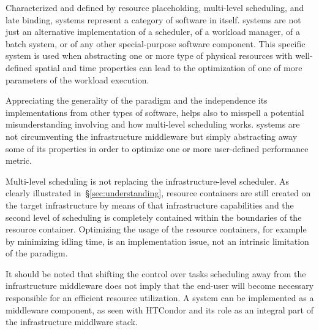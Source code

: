 \documentclass{sig-alternate}
\begin{document}
Characterized and defined by resource placeholding, multi-level scheduling, and
late binding, \pilot systems represent a category of software in itself. \pilot
systems are not just an alternative implementation of a scheduler, of a
workload manager, of a batch system, or of any other special-purpose software
component. This specific system is used when abstracting one or more type of
physical resources with well-defined spatial and time properties can lead to
the optimization of one of more parameters of the workload execution.

Appreciating the generality of the \pilot paradigm and the independence its
implementations from other types of software, helps also to misspell a
potential misunderstanding involving \pilots and how multi-level scheduling
works. \pilot systems are not circumventing the infrastructure middleware but
simply abstracting away some of its properties in order to optimize one or more
user-defined performance metric.

Multi-level scheduling is not replacing the infrastructure-level scheduler. As
clearly illustrated in~\S\ref{sec:understanding}, resource containers are still
created on the target infrastructure by means of that infrastructure
capabilities and the second level of scheduling is completely contained within
the boundaries of the resource container. Optimizing the usage of the resource
containers, for example by minimizing idling time, is an implementation issue,
not an intrinsic limitation of the \pilot paradigm.

It should be noted that shifting the control over tasks scheduling away from
the infrastructure middleware does not imply that the end-user will become
necessary responsible for an efficient resource utilization. A \pilot system
can be implemented as a middleware component, as seen with HTCondor and its
role as an integral part of the infrastructure middlware stack.

\end{document}
